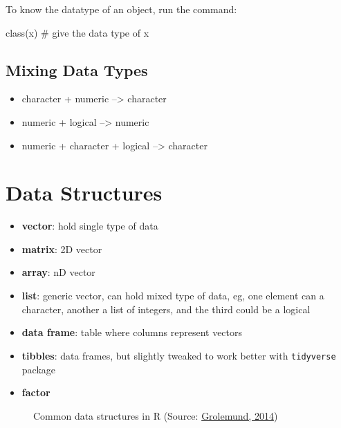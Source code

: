 \documentclass[
  letterpaper,
  DIV=11,
  numbers=noendperiod]{scrreprt}
\newenvironment{Shaded}{\begin{snugshade}}{\end{snugshade}}
\newcommand{\CommentTok}[1]{\textcolor[rgb]{0.37,0.37,0.37}{#1}}
\newcommand{\FunctionTok}[1]{\textcolor[rgb]{0.28,0.35,0.67}{#1}}
\newcommand{\NormalTok}[1]{\textcolor[rgb]{0.00,0.23,0.31}{#1}}
\providecommand{\tightlist}{%
  \setlength{\itemsep}{0pt}\setlength{\parskip}{0pt}}\usepackage{longtable,booktabs,array}
\begin{document}
To know the datatype of an object, run the command:

\begin{Shaded}
\begin{Highlighting}[]
\FunctionTok{class}\NormalTok{(x)    }\CommentTok{\# give the data type of x}
\end{Highlighting}
\end{Shaded}

\subsection{Mixing Data Types}\label{mixing-data-types}

\begin{itemize}
\tightlist
\item
  character + numeric --\textgreater{} character
\item
  numeric + logical --\textgreater{} numeric
\item
  numeric + character + logical --\textgreater{} character
\end{itemize}

\section{Data Structures}\label{data-structures}

\begin{itemize}
\tightlist
\item
  \textbf{vector}: hold single type of data
\item
  \textbf{matrix}: 2D vector
\item
  \textbf{array}: nD vector
\item
  \textbf{list}: generic vector, can hold mixed type of data, eg, one
  element can a character, another a list of integers, and the third
  could be a logical
\item
  \textbf{data frame}: table where columns represent vectors
\item
  \textbf{tibbles}: data frames, but slightly tweaked to work better
  with \texttt{tidyverse} package
\item
  \textbf{factor}
\end{itemize}

\begin{figure}


\caption{\label{fig-datastructure}Common data structures in R (Source:
\href{https://jjallaire.github.io/hopr/objects.html}{Grolemund, 2014})}

\end{figure}%
\end{document}
